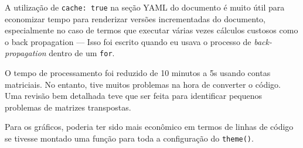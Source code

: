 \documentclass[
  a4paperpaper,
]{article}
\begin{document}
A utilização de \texttt{cache:\ true} na seção YAML do documento é muito
útil para economizar tempo para renderizar versões incrementadas do
documento, especialmente no caso de termos que executar várias vezes
cálculos custosos como o back propagation --- Isso foi escrito quando eu
usava o processo de \emph{back-propagation} dentro de um \texttt{for}.

O tempo de processamento foi reduzido de 10 minutos a 5s usando contas
matriciais. No entanto, tive muitos problemas na hora de converter o
código. Uma revisão bem detalhada teve que ser feita para identificar
pequenos problemas de matrizes transpostas.

Para os gráficos, poderia ter sido mais econômico em termos de linhas de
código se tivesse montado uma função para toda a configuração do
\texttt{theme()}.
\end{document}
